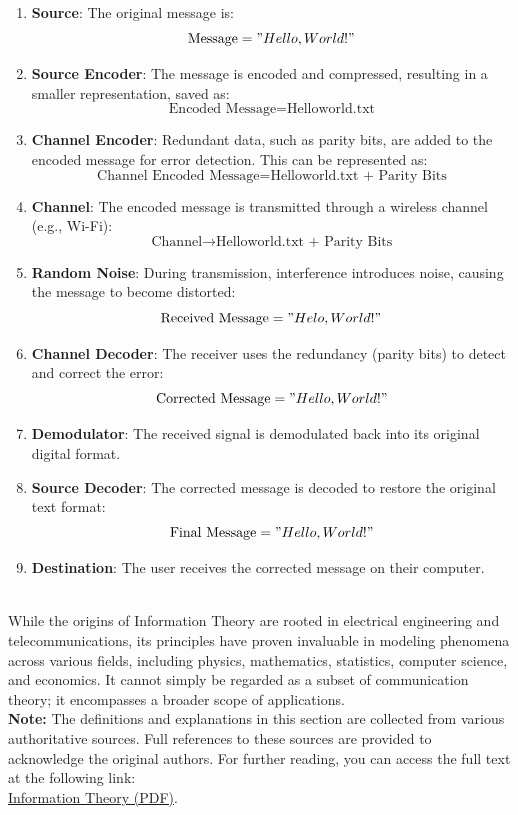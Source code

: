 \documentclass[12pt, oneside]{book}
\begin{document}
\begin{enumerate}[label=\arabic*.]
	\item \textbf{Source}: 
	The original message is: 
	\[\text{Message} = "Hello, World!"\]
	\item \textbf{Source Encoder}: 
	The message is encoded and compressed, resulting in a smaller representation, saved as:
	\[\text{Encoded Message} = \text{Helloworld.txt}\]
	\item \textbf{Channel Encoder}: 
	Redundant data, such as parity bits, are added to the encoded message for error detection. This can be represented as:
	\[	\text{Channel Encoded Message} = \text{Helloworld.txt + Parity Bits}\]
	\item \textbf{Channel}: 
	The encoded message is transmitted through a wireless channel (e.g., Wi-Fi):
	\[\text{Channel} \rightarrow \text{Helloworld.txt + Parity Bits}\]
	\item \textbf{Random Noise}: 
	During transmission, interference introduces noise, causing the message to become distorted:
	\[\text{Received Message} = "Helo, World!" \]
	
	\item \textbf{Channel Decoder}: 
	The receiver uses the redundancy (parity bits) to detect and correct the error:
	\[\text{Corrected Message} = "Hello, World!"\]
	
	\item \textbf{Demodulator}: 
	The received signal is demodulated back into its original digital format.
	
	\item \textbf{Source Decoder}: 
	The corrected message is decoded to restore the original text format:
	\[\text{Final Message} = "Hello, World!"\]
	
	\item \textbf{Destination}: 
	The user receives the corrected message on their computer.
\end{enumerate}
\\While the origins of Information Theory are rooted in electrical engineering and telecommunications, its principles have proven invaluable in modeling phenomena across various fields, including physics, mathematics, statistics, computer science, and economics. It cannot simply be regarded as a subset of communication theory; it encompasses a broader scope of applications.\vspace{0.5cm}\\
\textbf{Note:} The definitions and explanations in this section are collected from various authoritative sources. Full references to these sources are provided to acknowledge the original authors. For further reading, you can access the full text at the following link: \\
\href{https://www.ti.rwth-aachen.de/teaching/InformationTheory/ws1819/data/InformationTheory.pdf}{Information Theory (PDF)}.
\end{document}
